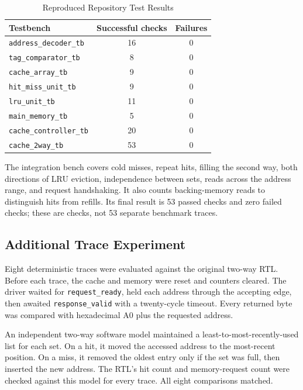 \documentclass[conference]{IEEEtran}
\begin{document}
\begin{table}[!t]
\caption{Reproduced Repository Test Results}
\label{tab:tests}
\centering
\begin{tabular}{lcc}
\toprule
Testbench & Successful checks & Failures \\
\midrule
\texttt{address\_decoder\_tb} & 16 & 0 \\
\texttt{tag\_comparator\_tb} & 8 & 0 \\
\texttt{cache\_array\_tb} & 9 & 0 \\
\texttt{hit\_miss\_unit\_tb} & 9 & 0 \\
\texttt{lru\_unit\_tb} & 11 & 0 \\
\texttt{main\_memory\_tb} & 5 & 0 \\
\texttt{cache\_controller\_tb} & 20 & 0 \\
\texttt{cache\_2way\_tb} & 53 & 0 \\
\bottomrule
\end{tabular}
\end{table}

The integration bench covers cold misses, repeat hits, filling the
second way, both directions of LRU eviction, independence between sets,
reads across the address range, and request handshaking. It also counts
backing-memory reads to distinguish hits from refills. Its final result
is 53 passed checks and zero failed checks; these are checks, not 53
separate benchmark traces.

\subsection{Additional Trace Experiment}

Eight deterministic traces were evaluated against the original two-way
RTL. Before each trace, the cache and memory were reset and counters
cleared. The driver waited for \texttt{request\_ready}, held each
address through the accepting edge, then awaited
\texttt{response\_valid} with a twenty-cycle timeout. Every returned
byte was compared with hexadecimal A0 plus the requested address.

An independent two-way software model maintained a
least-to-most-recently-used list for each set. On a hit, it moved the
accessed address to the most-recent position. On a miss, it removed the
oldest entry only if the set was full, then inserted the new address.
The RTL's hit count and memory-request count were checked against this
model for every trace. All eight comparisons matched.
\end{document}

